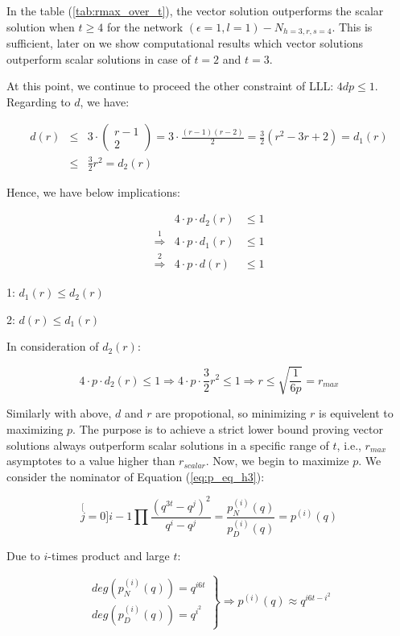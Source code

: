 In the table (\ref{tab:rmax_over_t}), the vector solution outperforms
the scalar solution when $t\geq4$ for the network $\left(\epsilon=1,l=1\right)-\ensuremath{N}_{h=3,r,s=4}$.
This is sufficient, later on we show computational results which vector
solutions outperform scalar solutions in case of $t=2$ and $t=3$.

At this point, we continue to proceed the other constraint of LLL:
$4dp\leq1$. Regarding to $d$, we have:

\begin{eqnarray*}
d(r) & \leq & 3\cdot\left(\begin{array}{c}
r-1\\
2
\end{array}\right)=3\cdot\frac{\left(r-1\right)\left(r-2\right)}{2}=\frac{3}{2}\left(r^{2}-3r+2\right)=d_{1}(r)\\
 & \leq & \frac{3}{2}r^{2}=d_{2}(r)
\end{eqnarray*}

Hence, we have below implications:

\begin{eqnarray*}
 & 4\cdot p\cdot d_{2}(r) & \leq1\\
\overset{1}{\Rightarrow} & 4\cdot p\cdot d_{1}(r) & \leq1\\
\overset{2}{\Rightarrow} & 4\cdot p\cdot d(r) & \leq1
\end{eqnarray*}

1: $d_{1}(r)\leq d_{2}(r)$

2: $d(r)\leq d_{1}(r)$

In consideration of $d_{2}(r)$:

\[
4\cdot p\cdot d_{2}(r)\leq1\Rightarrow4\cdot p\cdot\frac{3}{2}r^{2}\leq1\Rightarrow r\leq\sqrt{\frac{1}{6p}}=r_{max}
\]

Similarly with above, $d$ and $r$ are propotional, so minimizing
$r$ is equivelent to maximizing $p$. The purpose is to achieve a
strict lower bound proving vector solutions always outperform scalar
solutions in a specific range of $t$, i.e., $r_{max}$asymptotes
to a value higher than $r_{scalar}$. Now, we begin to maximize $p$.
We consider the nominator of Equation (\ref{eq:p_eq_h3}):

\[
\stackrel[j=0]{i-1}{\mathop{\prod}}\frac{\left(q^{3t}-q^{j}\right)^{2}}{q^{i}-q^{j}}=\frac{p_{N}^{(i)}(q)}{p_{D}^{(i)}(q)}=p^{(i)}(q)
\]

Due to $i$-times product and large $t$:

\[
\left.\begin{array}{c}
deg\left(p_{N}^{(i)}(q)\right)=q^{i6t}\\
deg\left(p_{D}^{(i)}(q)\right)=q^{i^{2}}
\end{array}\right\} \Rightarrow p^{(i)}(q)\approx q^{i6t-i^{2}}
\]

